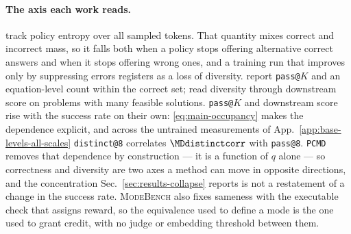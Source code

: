 \documentclass{article}
\makeatletter
\newcommand{\1}{\mathbf 1}
\newcommand{\mb}{\textsc{ModeBench}}
\newcommand{\pmd}{\texttt{PCMD}}
\newcommand{\distk}{\texttt{distinct@8}}
\theoremstyle{remark}
\theoremstyle{definition}
\theoremstyle{plain}
\makeatother
\begin{document}
\paragraph{The axis each work reads.}
\citet{cui2025entropy} track policy entropy over all sampled tokens. That
quantity mixes correct and incorrect mass, so it falls both when a policy stops
offering alternative correct answers and when it stops offering wrong ones, and
a training run that improves only by suppressing errors registers as a loss of
diversity. \citet{lochab2026ucpo} report \texttt{pass@}$K$ and an
equation-level count within the correct set; \citet{li2026distribution} read
diversity through downstream score on problems with many feasible solutions.
\texttt{pass@}$K$ and downstream score rise with the success rate on their
own: \eqref{eq:main-occupancy} makes the dependence explicit, and across the
\MDcells{} untrained measurements of App.~\ref{app:base-levels-all-scales}
\distk{} correlates $\MDdistinctcorr$ with \texttt{pass@8}.
\pmd{} removes that dependence by construction --- it is a function of $q$
alone --- so correctness and diversity are two axes a method can move in opposite
directions, and the concentration Sec.~\ref{sec:results-collapse} reports is
not a restatement of a change in the success rate. \mb{} also fixes sameness with the executable check that assigns
reward, so the equivalence used to define a mode is the one used to grant
credit, with no judge or embedding threshold between them.
\end{document}
